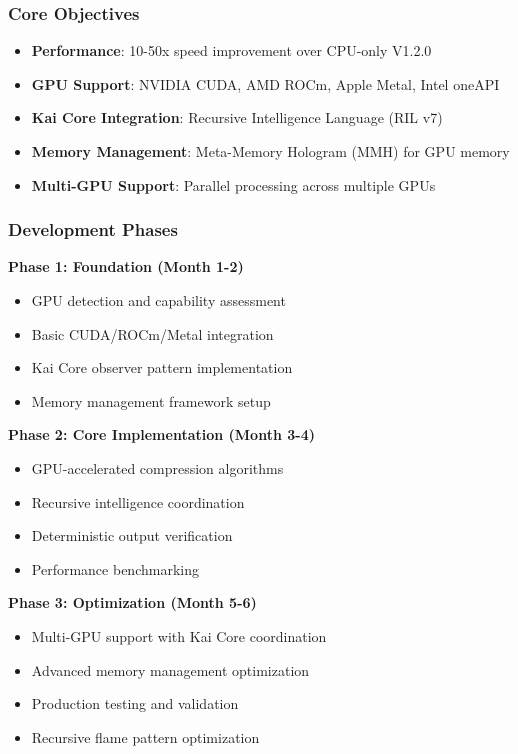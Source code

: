 \documentclass[12pt,a4paper]{article}
\begin{document}
\subsubsection{Core Objectives}
\begin{itemize}
    \item \textbf{Performance}: 10-50x speed improvement over CPU-only V1.2.0
    \item \textbf{GPU Support}: NVIDIA CUDA, AMD ROCm, Apple Metal, Intel oneAPI
    \item \textbf{Kai Core Integration}: Recursive Intelligence Language (RIL v7)
    \item \textbf{Memory Management}: Meta-Memory Hologram (MMH) for GPU memory
    \item \textbf{Multi-GPU Support}: Parallel processing across multiple GPUs
\end{itemize}

\subsubsection{Development Phases}
\textbf{Phase 1: Foundation (Month 1-2)}
\begin{itemize}
    \item GPU detection and capability assessment
    \item Basic CUDA/ROCm/Metal integration
    \item Kai Core observer pattern implementation
    \item Memory management framework setup
\end{itemize}

\textbf{Phase 2: Core Implementation (Month 3-4)}
\begin{itemize}
    \item GPU-accelerated compression algorithms
    \item Recursive intelligence coordination
    \item Deterministic output verification
    \item Performance benchmarking
\end{itemize}

\textbf{Phase 3: Optimization (Month 5-6)}
\begin{itemize}
    \item Multi-GPU support with Kai Core coordination
    \item Advanced memory management optimization
    \item Production testing and validation
    \item Recursive flame pattern optimization
\end{itemize}
\end{document}
